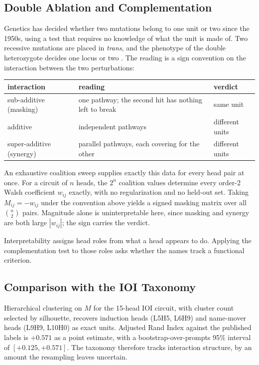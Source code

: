 \documentclass{article}
\begin{document}
\subsection{Double Ablation and Complementation}

Genetics has decided whether two mutations belong to one unit or two since the 1950s, using
a test that requires no knowledge of what the unit is made of. Two recessive mutations are
placed in \emph{trans}, and the phenotype of the double heterozygote decides one locus or
two \citep{benzer1955}. The reading is a sign convention on the interaction between the two
perturbations:

\begin{center}
\begin{tabular}{lll}
\toprule
interaction & reading & verdict \\
\midrule
sub-additive (masking) & one pathway; the second hit has nothing left to break & same unit \\
additive & independent pathways & different units \\
super-additive (synergy) & parallel pathways, each covering for the other & different units \\
\bottomrule
\end{tabular}
\end{center}

An exhaustive coalition sweep supplies exactly this data for every head pair at once. For a
circuit of $n$ heads, the $2^n$ coalition values determine every order-2 Walsh coefficient
$w_{ij}$ exactly, with no regularization and no held-out set. Taking $M_{ij} = -w_{ij}$
under the convention above yields a signed masking matrix over all $\binom{n}{2}$ pairs.
Magnitude alone is uninterpretable here, since masking and synergy are both large
$|w_{ij}|$; the sign carries the verdict.

Interpretability assigns head roles from what a head appears to do. Applying the
complementation test to those roles asks whether the names track a functional criterion.

\subsection{Comparison with the IOI Taxonomy}

Hierarchical clustering on $M$ for the 15-head IOI circuit, with cluster count selected by
silhouette, recovers induction heads (L5H5, L6H9) and name-mover heads (L9H9, L10H0) as
exact units. Adjusted Rand Index against the published labels is $+0.571$ as a point
estimate, with a bootstrap-over-prompts 95\% interval of $[+0.125, +0.571]$. The taxonomy
therefore tracks interaction structure, by an amount the resampling leaves uncertain.
\end{document}
